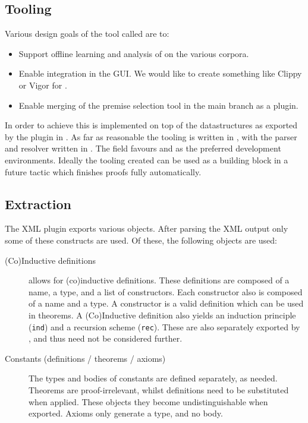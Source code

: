 \subsection{Tooling}
Various design goals of the \premiseselection tool called \roerei are to:
\begin{itemize}
    \item Support offline learning and analysis of \machinelearning on the various corpora.
    \item Enable integration in the \coqide GUI.
    	We would like to create something like Clippy or Vigor for \coq.
    \item Enable merging of the premise selection tool in the \coq main branch as a plugin.
\end{itemize}
In order to achieve this \roerei is implemented on top of the \acic datastructures as exported by the \xml plugin in \coq.
As far as reasonable the \premiseselection tooling is written in \cpp, with the parser and resolver written in \ocaml.
The \machinelearning field favours \python and \matlab as the preferred development environments.
Ideally the tooling created can be used as a building block in a future \coq tactic which finishes proofs fully automatically.

\subsection{Extraction}
\label{section:extraction}
The \coq XML plugin exports various objects.
After parsing the XML output only some of these constructs are used.
Of these, the following \coq objects are used:
\begin{description}
    \item[(Co)Inductive definitions]
        \coq allows for (co)inductive definitions.
        These definitions are composed of a name, a type, and a list of constructors.
        Each constructor also is composed of a name and a type.
        A constructor is a valid definition which can be used in theorems.
		A (Co)Inductive definition also yields an induction principle (\texttt{ind}) and a recursion scheme (\texttt{rec}).
		These are also separately exported by \coq, and thus need not be considered further.

    \item[Constants (definitions / theorems / axioms)]
        The types and bodies of constants are defined separately, as needed.
        Theorems are proof-irrelevant, whilst definitions need to be substituted when applied.
        These objects they become undistinguishable when exported.
        Axioms only generate a type, and no body.
\end{description}

